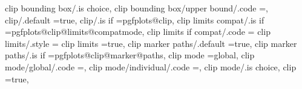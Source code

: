 {{{{{{{{{clip bounding box/.is choice,
clip bounding box/upper bound/.code                                =\def\pgfplots@clip@BB@mode{1},                                                                                                     
clip/.default                                                      =true,                                                                                                                              
clip/.is if                                                        =pgfplots@clip,                                                                                                                     
clip limits compat/.is if                                          =pgfplots@clip@limits@compatmode,                                                                                                   
clip limits if compat/.code                                        ={                                                                                                                                  
clip limits/.style                                                 ={                                                                                                                                  
clip limits                                                        =true,                                                                                                                              
clip marker paths/.default                                         =true,                                                                                                                              
clip marker paths/.is if                                           =pgfplots@clip@marker@paths,                                                                                                        
clip mode                                                          =global,                                                                                                                            
clip mode/global/.code                                             =\def\pgfplots@clipmode{1},                                                                                                         
clip mode/individual/.code                                         =\def\pgfplots@clipmode{2},                                                                                                         
clip mode/.is choice,
clip                                                               =true,                                                                                                                              
}}}}}}}}}}}
